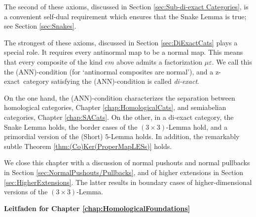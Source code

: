 \documentclass [12pt,oneside]{book}%
\theoremstyle{captionstyle}  %
\newcommand{\Defn}[1]{\emph{#1}}
\newcommand{\ZExact}{z-exact}									%
\newcommand{\Prdct}[2]{#1 \times #2}	 	%
\newcommand{\ANNInline}{(ANN)}																%
\begin{document}
The second of these axioms, discussed in Section \ref{sec:Sub-di-exact Categories}, is a convenient self-dual requirement which ensures that the Snake Lemma is true; see Section \ref{sec:Snakes}.

The strongest of these axioms, discussed in Section \ref{sec:DiExactCats} plays a special role. It requires every antinormal map to be a normal map. This means that every composite of the kind $em$ above admits a factorization $\mu\varepsilon$. We call this the \ANNInline-condition (for `antinormal composites are normal'), and a \ZExact\ category satisfying the \ANNInline-condition is called \Defn{di-exact}.

On the one hand, the \ANNInline-condition characterizes the separation between homological categories, Chapter \ref{chap:HomologicalCats}, and semiabelian categories, Chapter \ref{chap:SACats}. On the other, in a di-exact category, the Snake Lemma holds, the border cases of the $(\Prdct{3}{3})$-Lemma hold, and a primordial version of the (Short) $5$-Lemma holds. In addition, the remarkably subtle Theorem \ref{thm:(Co)Ker(ProperMapLESs)} holds.

We close this chapter with a discussion of normal pushouts and normal pullbacks in Section \ref{sec:NormalPushouts/Pullbacks}, and of higher extensions in Section \ref{sec:HigherExtensions}. The latter results in boundary cases of higher-dimensional versions of the $(\Prdct{3}{3})$-Lemma.


\newpage

\begin{center}
    \textbf{Leitfaden for Chapter \ref{chap:HomologicalFoundations}}
\end{center}

\bigskip
\end{document}
